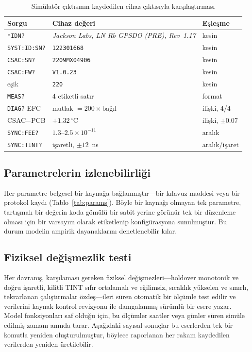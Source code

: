 \documentclass[conference]{IEEEtran}
\begin{document}
\begin{table}[t]
\caption{Simülatör çıktısının kaydedilen cihaz çıktısıyla karşılaştırması}
\label{tab:fidelity}
\centering
\footnotesize
\renewcommand{\arraystretch}{1.2}
\begin{tabular}{@{}p{}p{}p{}@{}}
\toprule
\textbf{Sorgu} & \textbf{Cihaz değeri} & \textbf{Eşleşme} \\
\midrule
\texttt{*IDN?} & \emph{Jackson Labs, LN Rb GPSDO (PRE), Rev~1.17} & kesin \\
\texttt{SYST:ID:SN?} & \texttt{122301668} & kesin \\
\texttt{CSAC:SN?} & \texttt{2209MX04906} & kesin \\
\texttt{CSAC:FW?} & \texttt{V1.0.23} & kesin \\
eşik & \texttt{220} & kesin \\
\texttt{MEAS?} & 4 etiketli satır & format \\
\texttt{DIAG?} EFC & mutlak $=200\times$bağıl & ilişki, 4/4 \\
CSAC$-$PCB & $+1.32\,^\circ$C & ilişki, $\pm0.07$ \\
\texttt{SYNC:FEE?} & $1.3$--$2.5\times10^{-11}$ & aralık \\
\texttt{SYNC:TINT?} & işaretli, $\pm12$~ns & aralık/işaret \\
\bottomrule
\end{tabular}
\end{table}

\subsection{Parametrelerin izlenebilirliği}
Her parametre belgesel bir kaynağa bağlanmıştır---bir kılavuz maddesi veya bir protokol kaydı (Tablo~\ref{tab:params}). Böyle bir kaynağı olmayan tek parametre, tartışmalı bir değerin koda gömülü bir sabit yerine görünür tek bir düzenleme olması için bir varsayım olarak etiketlenip konfigürasyona sunulmuştur. Bu durum modelin ampirik dayanaklarını denetlenebilir kılar.

\subsection{Fiziksel değişmezlik testi}
Her davranış, karşılaması gereken fiziksel değişmezleri---holdover monotonik ve doğru işaretli, kilitli TINT sıfır ortalamalı ve eğilimsiz, sıcaklık yükselen ve sınırlı, tekrarlanan çalıştırmalar özdeş---ileri süren otomatik bir ölçümle test edilir ve verilerini kaynak kontrol revizyonu ile damgalanmış sürümlü bir esere yazar. Model fonksiyonları saf olduğu için, bu ölçümler saatler veya günler süren simüle edilmiş zamanı anında tarar. Aşağıdaki sayısal sonuçlar bu eserlerden tek bir komutla yeniden oluşturulmuştur, böylece raporlanan her rakam kaydedilen verilerden yeniden üretilebilir.
\end{document}
